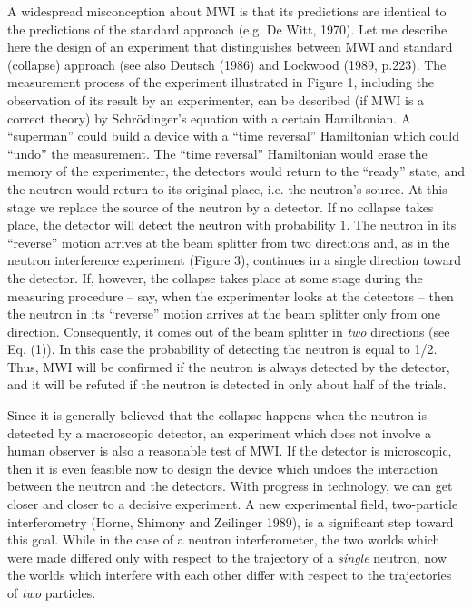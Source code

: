 A widespread misconception about MWI is that its predictions are
identical to the predictions of the standard approach (e.g. De Witt,
1970).  Let me describe here the design of an experiment that
distinguishes between MWI and standard (collapse) approach (see also
Deutsch (1986) and Lockwood (1989, p.223).  The measurement process of
the experiment illustrated in Figure 1, including the observation of
its result by an experimenter, can be described (if MWI is a correct
theory) by Schr\"odinger's equation with a certain Hamiltonian.  A
``superman'' could build a device with a ``time reversal'' Hamiltonian
which could ``undo'' the measurement.  The ``time reversal''
Hamiltonian would erase the memory of the experimenter, the detectors
would return to the ``ready'' state, and the neutron would return to
its original place, i.e. the neutron's source.  At this stage we
replace the source of the neutron by a detector.  If no collapse takes
place, the detector will detect the neutron with probability 1. The
neutron in its ``reverse'' motion arrives at the beam splitter from
two directions and, as in the neutron interference experiment (Figure
3), continues in a single direction toward the detector.  If, however,
the collapse takes place at some stage during the measuring procedure
-- say, when the experimenter looks at the detectors -- then the
neutron in its ``reverse'' motion arrives at the beam splitter only
from one direction.  Consequently, it comes out of the beam splitter
in {\it two} directions (see Eq.  (1)).  In this case the probability
of detecting the neutron is equal to 1/2.  Thus, MWI will be confirmed
if the neutron is always detected by the detector, and it will be
refuted if the neutron is detected in only about half of the trials.

Since it is generally believed that the collapse happens when the
neutron is detected by a macroscopic detector, an experiment which
does not involve a human observer is also a reasonable test of MWI.
If the detector is microscopic, then it is even feasible now to design
the device which undoes the interaction between the neutron and the
detectors.  With progress in technology, we can get closer and closer
to a decisive experiment.  A new experimental field, two-particle
interferometry (Horne, Shimony and Zeilinger 1989), is a significant
step toward this goal.  While in the case of a neutron interferometer,
the two worlds which were made differed only with respect to the
trajectory of a {\it single} neutron, now the worlds which interfere
with each other differ with respect to the trajectories of {\it two}
particles.
 
